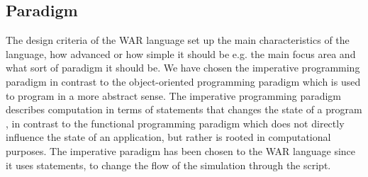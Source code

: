 \subsection{Paradigm}
The design criteria of the WAR language set up the main characteristics of the language, how advanced or how simple it should be e.g. the main focus area and what sort of paradigm it should be. We have chosen the imperative programming paradigm\cite{paradigms} in contrast to the object-oriented programming paradigm which is used to program in a more abstract sense. The imperative programming paradigm describes computation in terms of statements that changes the state of a program \cite{SPOBOG2}, in contrast to the functional programming paradigm which does not directly influence the state of an application, but rather is rooted in computational purposes. The imperative paradigm has been chosen to the WAR language since it uses statements, to change the flow of the simulation through the script.


